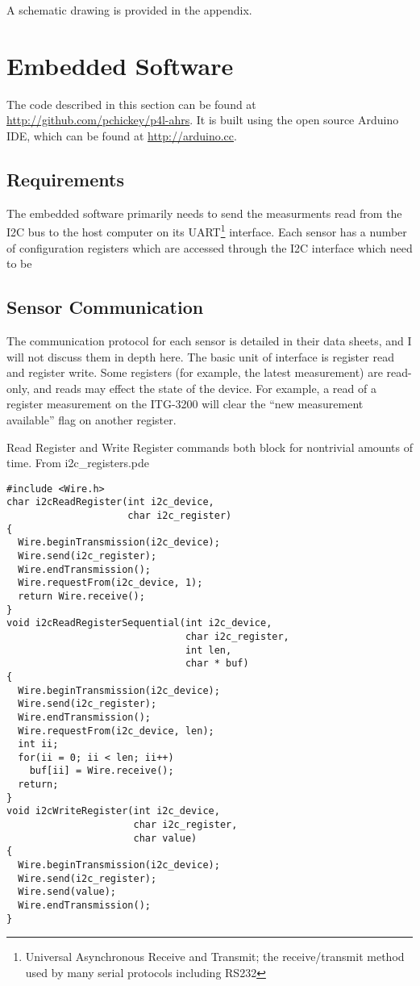\documentclass[12pt]{report}
\begin{document}

A schematic drawing is provided in the appendix. %

\lstset{language=C++,basicstyle=\ttfamily}
\section{Embedded Software}
The code described in this section can be found at \url{http://github.com/pchickey/p4l-ahrs}. It is built using the open source Arduino IDE, which can be found at \url{http://arduino.cc}.

\subsection{Requirements}
The embedded software primarily needs to send the measurments read from the I2C bus to the host computer on its 
UART\footnote{Universal Asynchronous Receive and Transmit; the receive/transmit method used by many serial protocols including RS232} 
interface. Each sensor has a number of configuration registers which are accessed through the I2C interface which need to be 

\subsection{Sensor Communication}

The communication protocol for each sensor is detailed in their data sheets, and I will not discuss them in depth here. The basic unit of interface is register read and register write. Some registers (for example, the latest measurement) are read-only, and reads may effect the state of the device. For example, a read of a register measurement on the ITG-3200 will clear the ``new measurement available'' flag on another register.   

Read Register and Write Register commands both block for nontrivial amounts of time.
\lstset{language=C++,basicstyle=\ttfamily}
From i2c\_registers.pde
\begin{lstlisting}
#include <Wire.h>
char i2cReadRegister(int i2c_device, 
                     char i2c_register)
{
  Wire.beginTransmission(i2c_device);
  Wire.send(i2c_register);
  Wire.endTransmission();
  Wire.requestFrom(i2c_device, 1);
  return Wire.receive();  
}
void i2cReadRegisterSequential(int i2c_device, 
                               char i2c_register, 
                               int len, 
                               char * buf)
{
  Wire.beginTransmission(i2c_device);
  Wire.send(i2c_register);
  Wire.endTransmission();
  Wire.requestFrom(i2c_device, len);
  int ii;
  for(ii = 0; ii < len; ii++)
    buf[ii] = Wire.receive();
  return;
}
void i2cWriteRegister(int i2c_device, 
                      char i2c_register, 
                      char value)
{
  Wire.beginTransmission(i2c_device);
  Wire.send(i2c_register);
  Wire.send(value);
  Wire.endTransmission();
}  
\end{lstlisting}
\end{document}
